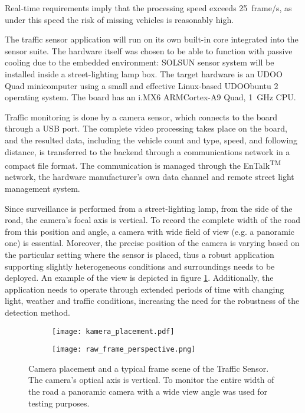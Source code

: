 Real-time requirements imply that the processing speed exceeds \SI{25}{frame/s}, as under this speed the risk of missing vehicles is reasonably high.

The traffic sensor application will run on its own built-in core integrated into the sensor suite.
The hardware itself was chosen to be able to function with passive cooling due to the embedded environment: SOLSUN sensor system will be installed inside a street-lighting lamp box.
The target hardware is an UDOO Quad minicomputer using a small and effective Linux-based UDOObuntu 2 operating system.
The board has an i.MX6 ARM\reg Cortex\reg-A9 Quad, \SI{1}{GHz} CPU.

Traffic monitoring is done by a camera sensor, which connects to the board through a USB port.
The complete video processing takes place on the board, and the resulted data, including the vehicle count and type, speed, and following distance, is transferred to the backend through a communications network in a compact file format.
The communication is managed through the EnTalk\textsuperscript{TM} network, the hardware manufacturer's own data channel and remote street light management system\cite{EnTalk}.

Since surveillance is performed from a street-lighting lamp, from the side of the road, the camera's focal axis is vertical.
To record the complete width of the road from this position and angle, a camera with wide field of view (e.g. a panoramic one) is essential.
Moreover, the precise position of the camera is varying based on the particular setting where the sensor is placed, thus a robust application supporting slightly heterogeneous conditions and surroundings needs to be deployed. 
An example of the view is depicted in figure \ref{fig:camera_position}.
Additionally, the application needs to operate through extended periods of time with changing light, weather and traffic conditions, increasing the need for the robustness of the detection method.

\begin{figure}
	\centering
	\begin{subfigure}{.5\textwidth}
		\centering
		\texttt{[image: kamera\_placement.pdf]}
	\end{subfigure}%
	\begin{subfigure}{.5\textwidth}
		\centering
		\texttt{[image: raw\_frame\_perspective.png]}
	\end{subfigure}
	\caption{Camera placement and a typical frame scene of the Traffic Sensor. The camera's optical axis is vertical. To monitor the entire width of the road a panoramic camera with a wide view angle was used for testing purposes.}
	\label{fig:camera_position}
\end{figure}

